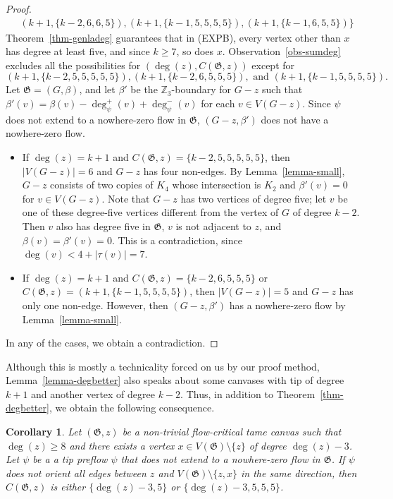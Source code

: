 \documentclass{article}
\newcommand{\Z}{\mathbb{Z}_3}
\newcommand\g{\mathfrak{G}}
\newtheorem{corollary}[theorem]{Corollary}
\begin{document}
\begin{proof}
\begin{align*}
&(k+1,\{k-2,6,6,5\}),(k+1,\{k-1,5,5,5,5\}), (k+1,\{k-1,6,5,5\})\}
\end{align*}
Theorem~\ref{thm-genladeg} guarantees that in (EXPB), every vertex other than $x$ has degree at least five, and since $k\ge 7$, so does $x$.
Observation~\ref{obs-sumdeg} excludes all the possibilities for $(\deg(z), C(\g,z))$
except for
$$(k+1,\{k-2,5,5,5,5,5\}), (k+1,\{k-2,6,5,5,5\}),\text{ and }(k+1,\{k-1,5,5,5,5\}).$$
Let $\g=(G,\beta)$, and let $\beta'$ be the $\Z$-boundary for $G-z$ such that $\beta'(v)=\beta(v)-\deg^+_\psi(v)+\deg^-_\psi(v)$ for each $v\in V(G-z)$.
Since $\psi$ does not extend to a nowhere-zero flow in $\g$, $(G-z,\beta')$ does not have a nowhere-zero flow.
\begin{itemize}
\item If $\deg(z)=k+1$ and $C(\g,z)=\{k-2,5,5,5,5,5\}$, then $|V(G-z)|=6$ and $G-z$ has four non-edges.  By Lemma~\ref{lemma-small},
$G-z$ consists of two copies of $K_4$ whose intersection is $K_2$ and $\beta'(v)=0$ for $v\in V(G-z)$.  Note that $G-z$ has two vertices of degree five; let $v$ be one of these degree-five vertices different from the vertex of $G$ of degree $k-2$.  Then $v$ also has degree five in $\g$, $v$ is not adjacent to $z$,
and $\beta(v)=\beta'(v)=0$.  This is a contradiction, since $\deg(v)<4+|\tau(v)|=7$.
\item If $\deg(z)=k+1$ and $C(\g,z)=\{k-2,6,5,5,5\}$ or $C(\g,z)=(k+1,\{k-1,5,5,5,5\})$, then $|V(G-z)|=5$ and $G-z$ has only one non-edge.
However, then $(G-z,\beta')$ has a nowhere-zero flow by Lemma~\ref{lemma-small}.
\end{itemize}
In any of the cases, we obtain a contradiction.
\end{proof}

Although this is mostly a technicality forced on us by our proof method,
Lemma~\ref{lemma-degbetter} also speaks about some canvases with tip of degree $k+1$
and another vertex of degree $k-2$.  Thus, in addition to Theorem~\ref{thm-degbetter},
we obtain the following consequence.
\begin{corollary}\label{cor-db3}
Let $(\g,z)$ be a non-trivial flow-critical tame canvas such that $\deg(z)\ge 8$
and there exists a vertex $x\in V(\g)\setminus\{z\}$ of degree $\deg(z)-3$.
Let $\psi$ be a a tip preflow $\psi$ that does not extend to a nowhere-zero flow in $\g$.
If $\psi$ does not orient all edges between $z$ and $V(\g)\setminus\{z,x\}$ in the same direction,
then $C(\g,z)$ is either $\{\deg(z)-3,5\}$ or $\{\deg(z)-3,5,5,5\}$.
\end{corollary}
\end{document}
